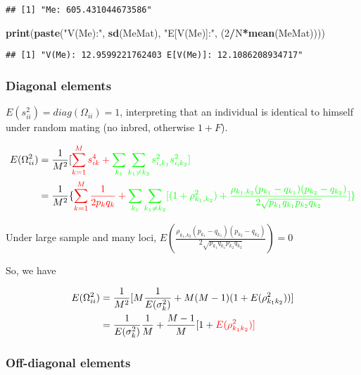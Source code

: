 \documentclass[]{article}
\newenvironment{Shaded}{\begin{snugshade}}{\end{snugshade}}
\newcommand{\DecValTok}[1]{\textcolor[rgb]{0.00,0.00,0.81}{#1}}
\newcommand{\KeywordTok}[1]{\textcolor[rgb]{0.13,0.29,0.53}{\textbf{#1}}}
\newcommand{\NormalTok}[1]{#1}
\newcommand{\OperatorTok}[1]{\textcolor[rgb]{0.81,0.36,0.00}{\textbf{#1}}}
\newcommand{\StringTok}[1]{\textcolor[rgb]{0.31,0.60,0.02}{#1}}
\begin{document}
\begin{verbatim}
## [1] "Me: 605.431044673586"
\end{verbatim}

\begin{Shaded}
\begin{Highlighting}[]
\KeywordTok{print}\NormalTok{(}\KeywordTok{paste}\NormalTok{(}\StringTok{"V(Me):"}\NormalTok{, }\KeywordTok{sd}\NormalTok{(MeMat), }\StringTok{"E[V(Me)]:"}\NormalTok{, (}\DecValTok{2}\OperatorTok{/}\NormalTok{N}\OperatorTok{*}\KeywordTok{mean}\NormalTok{(MeMat))))}
\end{Highlighting}
\end{Shaded}

\begin{verbatim}
## [1] "V(Me): 12.9599221762403 E[V(Me)]: 12.1086208934717"
\end{verbatim}

\hypertarget{diagonal-elements}{%
\subsubsection{Diagonal elements}\label{diagonal-elements}}

\(E(s_{ii}^2)=diag(\Omega_{ii})=1\), interpreting that an individual is
identical to himself under random mating (no inbred, otherwise \(1+F\)).

\begin{align}
E(\Omega_{ii}^2) &= \frac{1}{M^2}[\color{red} {\sum_{k=1}^M s_{ik}^4}+\color{green}{\sum_{k_1}\sum_{k_1 \ne k_2} s_{i,k_1}^2s_{i,k_2}^2}] \\
 &=\frac{1}{M^2}\{\color{red} {\sum_{k=1}^M \frac{1}{2p_kq_k}}+\color{green}{\sum_{k_1}\sum_{k_1 \ne k_2} [(1+\rho^2_{k_1,k_2})+\frac{\rho_{k_1,k_2}(p_{k_1}-q_{k_1})(p_{k_2}-q_{k_2})}{2\sqrt{p_{k_1}q_{k_1}p_{k_2}q_{k_2}}}]}\} 
\end{align}

Under large sample and many loci,
\(E(\frac{\rho_{k_1,k_2}(p_{k_1}-q_{k_1})(p_{k_2}-q_{k_2})}{2\sqrt{p_{k_1}q_{k_1}p_{k_2}q_{k_2}}})=0\)

So, we have

\begin{align}
E(\Omega_{ii}^2)&=\frac{1}{M^2}[M\frac{1}{E(\sigma_k^2)}+M(M-1)(1+E(\rho^2_{k_1k_2}))]\\
&=\frac{1}{E(\sigma_k^2)}\frac{1}{M}+\frac{M-1}{M}[1+\color{red}{E(\rho^2_{k_1k_2})}]
\end{align}

\hypertarget{off-diagonal-elements}{%
\subsubsection{Off-diagonal elements}\label{off-diagonal-elements}}
\end{document}
